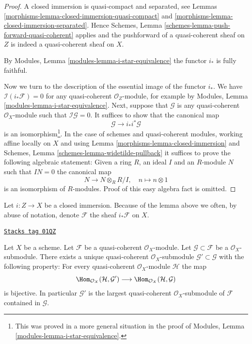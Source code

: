 \begin{proof}

A closed immersion is quasi-compact and separated, see
Lemmas \ref{morphisms-lemma-closed-immersion-quasi-compact} and
\ref{morphisms-lemma-closed-immersion-separated}. Hence
Schemes, Lemma \ref{schemes-lemma-push-forward-quasi-coherent}
applies and the pushforward of a quasi-coherent
sheaf on $Z$ is indeed a quasi-coherent sheaf on $X$.

\medskip\noindent
By Modules, Lemma \ref{modules-lemma-i-star-equivalence}
the functor $i_*$ is fully faithful.

\medskip\noindent
Now we turn to the description of the essential image of the
functor $i_*$. We have $\mathcal{I}(i_*\mathcal{F}) = 0$
for any quasi-coherent $\mathcal{O}_Z$-module, for example by
Modules, Lemma \ref{modules-lemma-i-star-equivalence}.
Next, suppose that $\mathcal{G}$
is any quasi-coherent $\mathcal{O}_X$-module such that
$\mathcal{I}\mathcal{G} = 0$. It suffices to show that the canonical map
$$
\mathcal{G} \longrightarrow i_* i^*\mathcal{G}
$$
is an isomorphism\footnote{This was proved in a more general situation
in the proof of  Modules, Lemma \ref{modules-lemma-i-star-equivalence}.}.
In the case of schemes and quasi-coherent modules, working affine locally
on $X$ and using Lemma \ref{morphisms-lemma-closed-immersion} and
Schemes, Lemma \ref{schemes-lemma-widetilde-pullback}
it suffices to prove the following algebraic statement: Given a ring
$R$, an ideal $I$ and an $R$-module $N$ such that $IN = 0$ the canonical map
$$
N \longrightarrow N \otimes_R R/I,\quad
n \longmapsto n \otimes 1
$$
is an isomorphism of $R$-modules. Proof of this easy algebra fact is omitted.
\end{proof}

Let $i : Z \to X$ be a closed immersion. Because of the lemma above we often,
by abuse of notation, denote $\mathcal{F}$ the sheaf $i_*\mathcal{F}$ on $X$.

\begin{lemma}
\label{morphisms-lemma-largest-quasi-coherent-subsheaf}
\href{https://stacks.math.columbia.edu/tag/01QZ}{\texttt{Stacks tag 01QZ}}

Let $X$ be a scheme. Let $\mathcal{F}$ be a quasi-coherent
$\mathcal{O}_X$-module. Let $\mathcal{G} \subset \mathcal{F}$
be a $\mathcal{O}_X$-submodule. There exists a unique quasi-coherent
$\mathcal{O}_X$-submodule $\mathcal{G}' \subset \mathcal{G}$
with the following property: For every quasi-coherent $\mathcal{O}_X$-module
$\mathcal{H}$ the map
$$
\Hom_{\mathcal{O}_X}(\mathcal{H}, \mathcal{G}')
\longrightarrow
\Hom_{\mathcal{O}_X}(\mathcal{H}, \mathcal{G})
$$
is bijective. In particular $\mathcal{G}'$ is the largest quasi-coherent
$\mathcal{O}_X$-submodule of $\mathcal{F}$ contained in $\mathcal{G}$.
\end{lemma}

